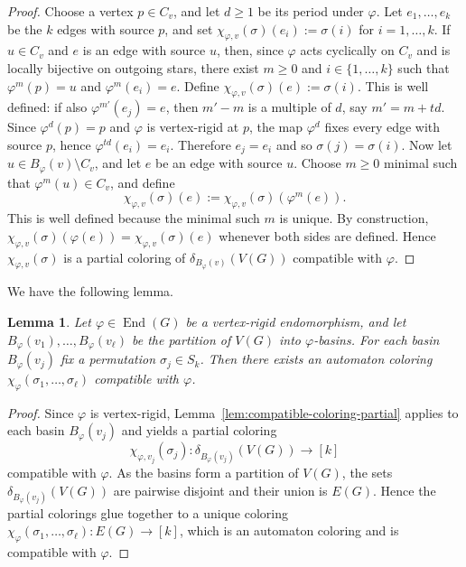 \documentclass[a4paper,10pt]{amsart}
\theoremstyle{plain}
\newtheorem{lemma}[theorem]{Lemma}
\theoremstyle{definition}
\DeclareMathOperator{\End}{End}
\begin{document}
\begin{proof}
Choose a vertex $p\in C_v$, and let $d\ge 1$ be its period under $\varphi$. Let $e_1,\dots,e_k$ be the $k$ edges with source $p$, and set $\chi_{\varphi,v}(\sigma)(e_i):=\sigma(i)$ for $i=1,\dots,k$. If $u\in C_v$ and $e$ is an edge with source $u$, then, since $\varphi$ acts cyclically on $C_v$ and is locally bijective on outgoing stars, there exist $m\ge 0$ and $i\in\{1,\dots,k\}$ such that $\varphi^m(p)=u$ and $\varphi^m(e_i)=e$. Define $\chi_{\varphi,v}(\sigma)(e):=\sigma(i)$. This is well defined: if also $\varphi^{m'}(e_j)=e$, then $m'-m$ is a multiple of $d$, say $m'=m+td$. Since $\varphi^d(p)=p$ and $\varphi$ is vertex-rigid at $p$, the map $\varphi^d$ fixes every edge with source $p$, hence $\varphi^{td}(e_i)=e_i$. Therefore $e_j=e_i$ and so $\sigma(j)=\sigma(i)$. Now let $u\in B_\varphi(v)\setminus C_v$, and let $e$ be an edge with source $u$. Choose $m\ge 0$ minimal such that $\varphi^m(u)\in C_v$, and define
\[
\chi_{\varphi,v}(\sigma)(e):=\chi_{\varphi,v}(\sigma)(\varphi^m(e)).
\]
This is well defined because the minimal such $m$ is unique. By construction, $\chi_{\varphi,v}(\sigma)(\varphi(e))=\chi_{\varphi,v}(\sigma)(e)$ whenever both sides are defined. Hence $\chi_{\varphi,v}(\sigma)$ is a partial coloring of $\delta_{B_\varphi(v)}(V(G))$ compatible with $\varphi$.
\end{proof}

We have the following lemma.

\begin{lemma}\label{lem:compatible-coloring-full}
Let $\varphi\in \End(G)$ be a vertex-rigid endomorphism, and let $B_\varphi(v_1),\dots,B_\varphi(v_\ell)$ be the partition of $V(G)$ into $\varphi$-basins. For each basin $B_\varphi(v_j)$ fix a permutation $\sigma_j\in S_k$. Then there exists an automaton coloring $\chi_\varphi(\sigma_1,\dots,\sigma_\ell)$ compatible with $\varphi$.
\end{lemma}

\begin{proof}
Since $\varphi$ is vertex-rigid, Lemma~\ref{lem:compatible-coloring-partial} applies to each basin $B_\varphi(v_j)$ and yields a partial coloring
\[
\chi_{\varphi,v_j}(\sigma_j):\delta_{B_\varphi(v_j)}(V(G))\to [k]
\]
compatible with $\varphi$. As the basins form a partition of $V(G)$, the sets $\delta_{B_\varphi(v_j)}(V(G))$ are pairwise disjoint and their union is $E(G)$. Hence the partial colorings glue together to a unique coloring $\chi_\varphi(\sigma_1,\dots,\sigma_\ell):E(G)\to [k]$, which is an automaton coloring and is compatible with $\varphi$.
\end{proof}
\end{document}
